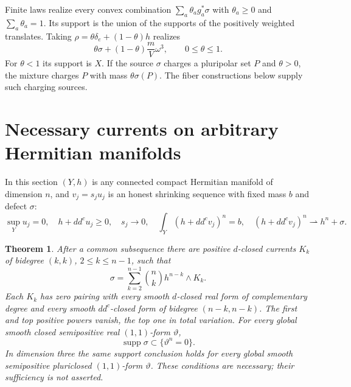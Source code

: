 \documentclass[11pt]{article}
\newtheorem{theorem}{Theorem}
\newcommand{\ddc}{dd^c}
\begin{document}
Finite laws realize every convex combination
$\sum_a\theta_ag_a^*\sigma$ with $\theta_a\geq0$ and
$\sum_a\theta_a=1$. Its support is the union of the supports of
the positively weighted translates. Taking
$\rho=\theta\delta_e+(1-\theta)h$ realizes
\[
 \theta\sigma+(1-\theta)\frac mV\omega^3,
 \qquad 0\leq\theta\leq1.
\]
For $\theta<1$ its support is $X$. If the source $\sigma$ charges
a pluripolar set $P$ and $\theta>0$, the mixture charges $P$ with
mass $\theta\sigma(P)$. The fiber constructions below supply such
charging sources.

\section{Necessary currents on arbitrary Hermitian manifolds}
In this section $(Y,h)$ is any connected compact Hermitian manifold
of dimension $n$, and $v_j=s_ju_j$ is an honest shrinking sequence
with fixed mass $b$ and defect $\sigma$:
\[
 \sup_Yu_j=0,\quad h+\ddc u_j\geq0,\quad s_j\to0,\quad
 \int_Y(h+\ddc v_j)^n=b,\quad
 (h+\ddc v_j)^n\rightharpoonup h^n+\sigma.
\]

\begin{theorem}\label{thm:general}
After a common subsequence there are positive $d$-closed currents
$K_k$ of bidegree $(k,k)$, $2\leq k\leq n-1$, such that
\[
 \sigma=\sum_{k=2}^{n-1}\binom nk h^{n-k}\wedge K_k.
 \tag{6}\label{eq:general-defect}
\]
Each $K_k$ has zero pairing with every smooth $d$-closed real form
of complementary degree and every smooth $dd^c$-closed form of
bidegree $(n-k,n-k)$. The first and top positive powers vanish,
the top one in total variation. For every global smooth closed
semipositive real $(1,1)$-form $\vartheta$,
\[
\operatorname{supp}\sigma\subset\{\vartheta^n=0\}.
\]
In dimension three the same support conclusion holds for every
global smooth semipositive pluriclosed $(1,1)$-form $\vartheta$.
These conditions are necessary; their sufficiency is not asserted.
\end{theorem}
\end{document}

